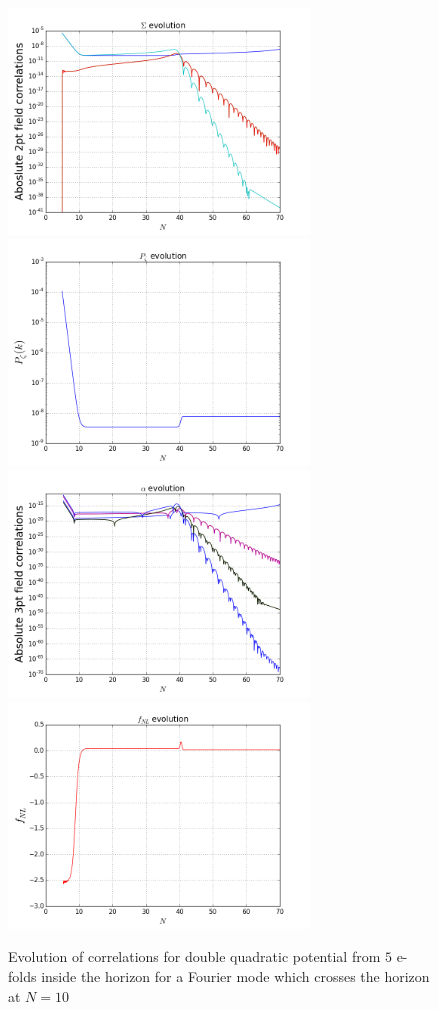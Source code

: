 \documentclass[10pt,
amsmath,amssymb,
aps,prd,nofootinbib,eqsecnum,a4paper]{revtex4}
\begin{document}
\begin{figure}[H]
\centering
\includegraphics[width=8cm]{DQ2}\includegraphics[width=8cm]{DQ3}\
\includegraphics[width=8cm]{DQ4}\includegraphics[width=8cm]{DQ5}\
\caption{\label{double2}
Evolution of correlations for double quadratic potential from $5$ e-folds inside the 
horizon for a Fourier mode
which crosses the horizon at $N=10$}\label{shot3}
\end{figure}
\end{document}
